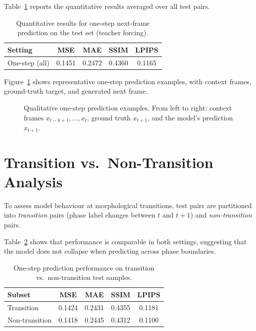 \documentclass[12pt, a4paper, twoside]{report}
\begin{document}
Table~\ref{tab:onestep} reports the quantitative results averaged over all
test pairs.

\begin{table}[H]
\centering
\caption{Quantitative results for one-step next-frame prediction on the test
         set (teacher forcing).}
\label{tab:onestep}
\begin{tabular}{lcccc}
\toprule
\textbf{Setting} & \textbf{MSE} & \textbf{MAE} & \textbf{SSIM} & \textbf{LPIPS} \\
\midrule
One-step (all) & 0.1451 & 0.2472 & 0.4360 & 0.1165 \\
\bottomrule
\end{tabular}
\end{table}

Figure~\ref{fig:onestep_qual} shows representative one-step prediction
examples, with context frames, ground-truth target, and generated next frame.

\begin{figure}[H]
\centering
\caption{Qualitative one-step prediction examples. From left to right:
         context frames $x_{t-k+1}, \ldots, x_t$, ground truth $x_{t+1}$,
         and the model's prediction $\hat{x}_{t+1}$.}
\label{fig:onestep_qual}
\end{figure}

\section{Transition vs.\ Non-Transition Analysis}
\label{sec:transition}

To assess model behaviour at morphological transitions, test pairs are
partitioned into \emph{transition} pairs (phase label changes between $t$
and $t{+}1$) and \emph{non-transition} pairs.

Table~\ref{tab:transition} shows that performance is comparable in both
settings, suggesting that the model does not collapse when predicting across
phase boundaries.

\begin{table}[H]
\centering
\caption{One-step prediction performance on transition vs.\ non-transition
         test samples.}
\label{tab:transition}
\begin{tabular}{lcccc}
\toprule
\textbf{Subset} & \textbf{MSE} & \textbf{MAE} & \textbf{SSIM} & \textbf{LPIPS} \\
\midrule
Transition     & 0.1424 & 0.2431 & 0.4355 & 0.1181 \\
Non-transition & 0.1418 & 0.2445 & 0.4312 & 0.1100 \\
\bottomrule
\end{tabular}
\end{table}
\end{document}
